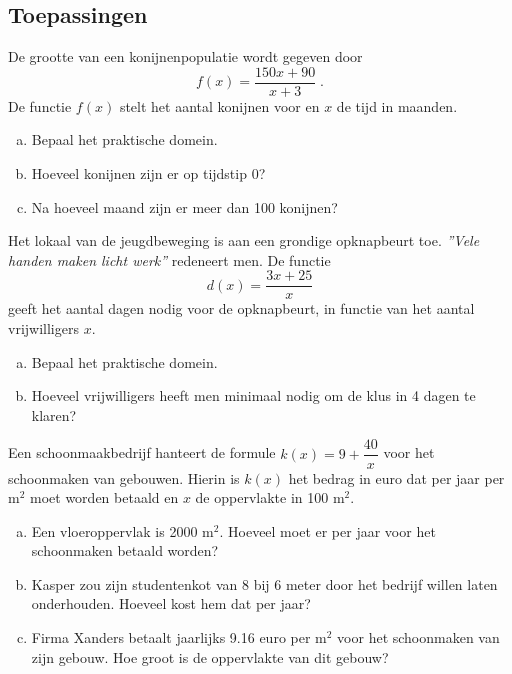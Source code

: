 \documentclass[a4paper,12pt]{article}
\begin{document}
\needspace{3cm}
\subsection{Toepassingen}

\begin{oefening}
De grootte van een konijnenpopulatie wordt gegeven door
$$f(x)=\dfrac{150x+90}{x+3}\;.$$
De functie $f(x)$ stelt het aantal konijnen voor en $x$ de tijd in maanden.
\begin{enumerate}[(a)]
  \item Bepaal het praktische domein.
  \item Hoeveel konijnen zijn er op tijdstip 0?
  \item Na hoeveel maand zijn er meer dan 100 konijnen?
\end{enumerate}
\end{oefening}

\begin{oefening}
Het lokaal van de jeugdbeweging is aan een grondige opknapbeurt toe. {\em ''Vele handen maken licht werk''} redeneert men. De functie
$$d(x)=\dfrac{3x+25}{x}$$
geeft het aantal dagen nodig voor de opknapbeurt, in functie van het aantal vrijwilligers $x$.
\begin{enumerate}[(a)]
  \item Bepaal het praktische domein.
  \item Hoeveel vrijwilligers heeft men minimaal nodig om de klus in 4 dagen te klaren?
\end{enumerate}
\end{oefening}

\begin{oefening}
Een schoonmaakbedrijf hanteert de formule $k(x)=9+\dfrac{40}{x}$ voor het schoonmaken van gebouwen. Hierin is $k(x)$ het bedrag in euro dat per jaar per m$^2$ moet worden betaald en $x$ de oppervlakte in 100 m$^2$.
\begin{enumerate}[(a)]
  \item Een vloeroppervlak is 2000 m$^2$. Hoeveel moet er per jaar voor het schoonmaken betaald worden?
  \item Kasper zou zijn studentenkot van 8 bij 6 meter door het bedrijf willen laten onderhouden. Hoeveel kost hem dat per jaar?
  \item Firma Xanders betaalt jaarlijks 9.16 euro per m$^2$ voor het schoonmaken van zijn gebouw. Hoe groot is de oppervlakte van dit gebouw?
\end{enumerate}
\end{oefening}
\end{document}
